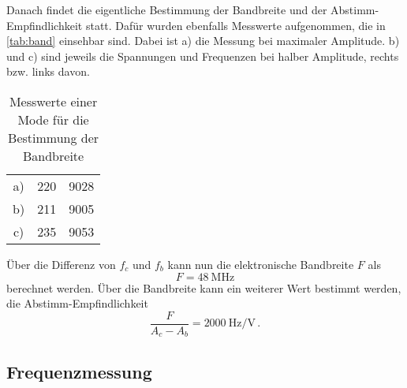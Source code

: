 Danach findet die eigentliche Bestimmung der Bandbreite und der Abstimm-Empfindlichkeit statt.
Dafür wurden ebenfalls Messwerte aufgenommen, die in \autoref{tab:band} einsehbar sind.
Dabei ist a) die Messung bei maximaler Amplitude.
b) und c) sind jeweils die Spannungen und Frequenzen bei halber Amplitude, rechts bzw. links davon.

\begin{table}
    \centering
    \caption{Messwerte einer Mode für die Bestimmung der Bandbreite}
    \label{tab:band}
    \begin{tabular}{c S[table-format=3.0] S[table-format=4.0]}
        \toprule
         &  &  \\
        \midrule
        a) & 220 & 9028 \\
        b) & 211 & 9005 \\
        c) & 235 & 9053 \\
        \bottomrule
    \end{tabular}
\end{table}

Über die Differenz von $f_c$ und $f_b$ kann nun die elektronische Bandbreite $F$ als 
\begin{equation*}
    F = \SI{48}{\mega\hertz}
\end{equation*}
berechnet werden.
Über die Bandbreite kann ein weiterer Wert bestimmt werden, die Abstimm-Empfindlichkeit
\begin{equation*}
    \frac{F}{A_c - A_b} = \SI{2000}{\hertz\per\volt} \, .
\end{equation*}

\subsection{Frequenzmessung}
\label{ssec:a2}

